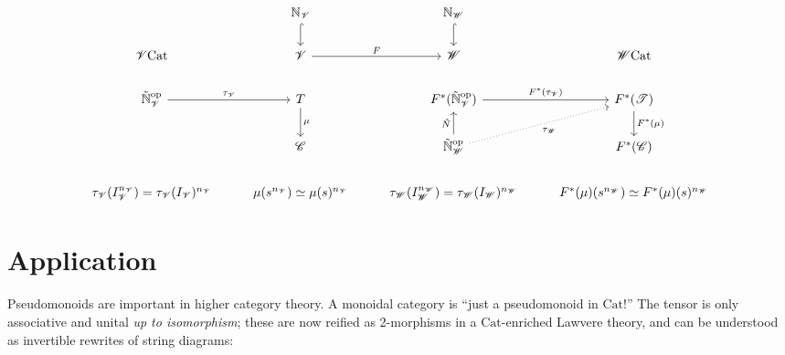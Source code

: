 \documentclass[a4paper,UKenglish]{article}
\theoremstyle{definition}
\newcommand{\Cat}{\mathrm{Cat}}
\newcommand{\op}{\mathrm{op}}
\newcommand{\NN}{\mathbb{N}}
\newcommand{\V}{\mathscr{V}}
\newcommand{\W}{\mathscr{W}}
\newcommand{\C}{\mathscr{C}}
\newcommand{\T}{\mathscr{T}}
\begin{document}
\[\begin{tikzcd}
	& \NN_\V \arrow[hookrightarrow]{d} & \NN_\W \arrow[hookrightarrow]{d}\\
	\V\Cat & \V \arrow["F"]{r} & \W & \W\Cat\\
	\tilde{\NN}_\V^\op \arrow["\tau_\V"]{r} & T \arrow["\mu"]{d} & F^*(\tilde{\NN}_\V^\op) \arrow["F^*(\tau_\V)"]{r} & F^*(\T) \arrow["F^*(\mu)"]{d}\\
	& \C & \tilde{\NN}_\W^\op \arrow["\tilde{N}"]{u} \arrow[swap,dotted,"\tau_\W"]{ru} & F^*(\C)\\
	\tau_\V(I_\V^{n_\V}) = \tau_\V(I_\V)^{n_\V} & \mu(s^{n_\V}) \simeq \mu(s)^{n_\V} & \tau_\W(I_\W^{n_\W}) = \tau_\W(I_\W)^{n_\W} & F^*(\mu)(s^{n_\W}) \simeq F^*(\mu)(s)^{n_\W}
\end{tikzcd}\]

\section{Application}
Pseudomonoids \cite{pseudo} are important in higher category theory. A monoidal category is ``just a pseudomonoid in $\Cat$!'' The tensor is only associative and unital \textit{up to isomorphism}; these are now reified as 2-morphisms in a $\Cat$-enriched Lawvere theory, and can be understood as invertible rewrites of string diagrams:
\end{document}
